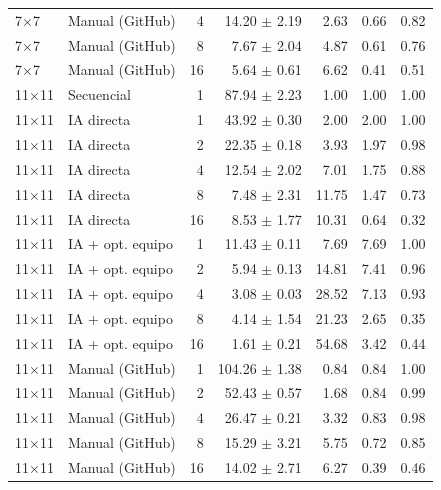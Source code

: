 \begin{tabular}{llrrrrr}
7$\times$7 & Manual (GitHub) & 4 & 14.20 $\pm$ 2.19 & 2.63 & 0.66 & 0.82 \\
7$\times$7 & Manual (GitHub) & 8 & 7.67 $\pm$ 2.04 & 4.87 & 0.61 & 0.76 \\
7$\times$7 & Manual (GitHub) & 16 & 5.64 $\pm$ 0.61 & 6.62 & 0.41 & 0.51 \\
\midrule
11$\times$11 & Secuencial & 1 & 87.94 $\pm$ 2.23 & 1.00 & 1.00 & 1.00 \\
11$\times$11 & IA directa & 1 & 43.92 $\pm$ 0.30 & 2.00 & 2.00 & 1.00 \\
11$\times$11 & IA directa & 2 & 22.35 $\pm$ 0.18 & 3.93 & 1.97 & 0.98 \\
11$\times$11 & IA directa & 4 & 12.54 $\pm$ 2.02 & 7.01 & 1.75 & 0.88 \\
11$\times$11 & IA directa & 8 & 7.48 $\pm$ 2.31 & 11.75 & 1.47 & 0.73 \\
11$\times$11 & IA directa & 16 & 8.53 $\pm$ 1.77 & 10.31 & 0.64 & 0.32 \\
11$\times$11 & IA + opt. equipo & 1 & 11.43 $\pm$ 0.11 & 7.69 & 7.69 & 1.00 \\
11$\times$11 & IA + opt. equipo & 2 & 5.94 $\pm$ 0.13 & 14.81 & 7.41 & 0.96 \\
11$\times$11 & IA + opt. equipo & 4 & 3.08 $\pm$ 0.03 & 28.52 & 7.13 & 0.93 \\
11$\times$11 & IA + opt. equipo & 8 & 4.14 $\pm$ 1.54 & 21.23 & 2.65 & 0.35 \\
11$\times$11 & IA + opt. equipo & 16 & 1.61 $\pm$ 0.21 & 54.68 & 3.42 & 0.44 \\
11$\times$11 & Manual (GitHub) & 1 & 104.26 $\pm$ 1.38 & 0.84 & 0.84 & 1.00 \\
11$\times$11 & Manual (GitHub) & 2 & 52.43 $\pm$ 0.57 & 1.68 & 0.84 & 0.99 \\
11$\times$11 & Manual (GitHub) & 4 & 26.47 $\pm$ 0.21 & 3.32 & 0.83 & 0.98 \\
11$\times$11 & Manual (GitHub) & 8 & 15.29 $\pm$ 3.21 & 5.75 & 0.72 & 0.85 \\
11$\times$11 & Manual (GitHub) & 16 & 14.02 $\pm$ 2.71 & 6.27 & 0.39 & 0.46 \\
\bottomrule
\end{tabular}

